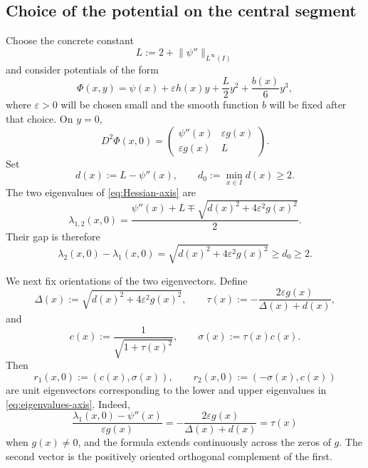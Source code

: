 \documentclass[11pt,reqno]{amsart}
\theoremstyle{definition}
\newcommand{\norm}[1]{\lVert#1\rVert}
\begin{document}
\subsection{Choice of the potential on the central segment}

Choose the concrete constant
\begin{equation}
  L:=2+\norm{\psi''}_{L^\infty(I)}
  \label{eq:L-choice}
\end{equation}
and consider potentials of the form
\begin{equation}
  \Phi(x,y)
  =\psi(x)+\varepsilon h(x)y+\frac{L}{2}y^2+\frac{b(x)}6y^3,
  \label{eq:Phi}
\end{equation}
where $\varepsilon>0$ will be chosen small and the smooth function $b$ will
be fixed after that choice.  On $y=0$,
\begin{equation}
  D^2\Phi(x,0)
  =
  \begin{pmatrix}
    \psi''(x)&\varepsilon g(x)\\
    \varepsilon g(x)&L
  \end{pmatrix}.
  \label{eq:Hessian-axis}
\end{equation}
Set
\begin{equation}
  d(x):=L-\psi''(x),
  \qquad
  d_0:=\min_{x\in I}d(x)\ge2.
  \label{eq:d-d0}
\end{equation}
The two eigenvalues of \cref{eq:Hessian-axis} are
\begin{equation}
  \lambda_{1,2}(x,0)
  =\frac{\psi''(x)+L
  \mp\sqrt{d(x)^2+4\varepsilon^2g(x)^2}}{2}.
  \label{eq:eigenvalues-axis}
\end{equation}
Their gap is therefore
\begin{equation}
  \lambda_2(x,0)-\lambda_1(x,0)
  =\sqrt{d(x)^2+4\varepsilon^2g(x)^2}
  \ge d_0\ge2.
  \label{eq:eigenvalue-gap-axis}
\end{equation}

We next fix orientations of the two eigenvectors.  Define
\begin{equation}
  \Delta(x):=\sqrt{d(x)^2+4\varepsilon^2g(x)^2},
  \qquad
  \tau(x):=-\frac{2\varepsilon g(x)}{\Delta(x)+d(x)},
  \label{eq:Delta-tau}
\end{equation}
and
\begin{equation}
  c(x):=\frac{1}{\sqrt{1+\tau(x)^2}},
  \qquad
  \sigma(x):=\tau(x)c(x).
  \label{eq:c-sigma}
\end{equation}
Then
\begin{equation}
  r_1(x,0):=(c(x),\sigma(x)),
  \qquad
  r_2(x,0):=(-\sigma(x),c(x))
  \label{eq:eigenvectors-axis}
\end{equation}
are unit eigenvectors corresponding to the lower and upper eigenvalues in
\cref{eq:eigenvalues-axis}.  Indeed,
\begin{equation}
  \frac{\lambda_1(x,0)-\psi''(x)}{\varepsilon g(x)}
  =-\frac{2\varepsilon g(x)}{\Delta(x)+d(x)}=\tau(x)
\end{equation}
when $g(x)\neq0$, and the formula extends continuously across the zeros of
$g$.  The second vector is the positively oriented orthogonal complement of
the first.
\end{document}
